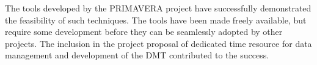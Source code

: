 \documentclass[gmd, manuscript]{copernicus}
\begin{document}
The tools developed by the PRIMAVERA project have successfully demonstrated the feasibility of such techniques. The tools have been made freely available, but require some development before they can be seamlessly adopted by other projects. The inclusion in the project proposal of dedicated time resource for data management and development of the DMT contributed to the success.













%


\noappendix       %


\end{document}
